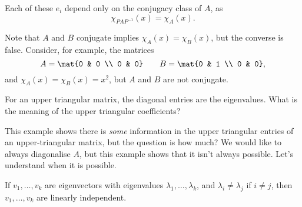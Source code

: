 	Each of these $e_i$ depend only on the conjugacy class of $A$, as
	\begin{equation*}
		\chi_{PAP^{-1}}(x) = \chi_A(x).
	\end{equation*}

\bigskip

Note that $A$ and $B$ conjugate implies $\chi_A(x)=\chi_B(x)$, but the converse is false. Consider, for example, the matrices
\begin{equation*}
	A = \mat{0 & 0 \\ 0 & 0}
	\qquad
	B = \mat{0 & 1 \\ 0 & 0},
\end{equation*}
and $\chi_A(x) = \chi_B(x) =x^2$, but $A$ and $B$ are not conjugate.

For an upper triangular matrix, the diagonal entries are the eigenvalues. What is the meaning of the upper triangular coefficients? 

This example shows there is \emph{some} information in the upper triangular entries of an upper-triangular matrix, but the question is how much? We would like to always diagonalise $A$, but this example shows that it isn't always possible. Let's understand when it is possible. 

% 

\begin{proposition}
	If $v_1,\ldots,v_k$ are eigenvectors with eigenvalues $\lambda_1,\ldots,\lambda_k$, and $\lambda_i\neq \lambda_j$ if $i\neq j$, then $v_1,\ldots,v_k$ are linearly independent. %
\end{proposition}

